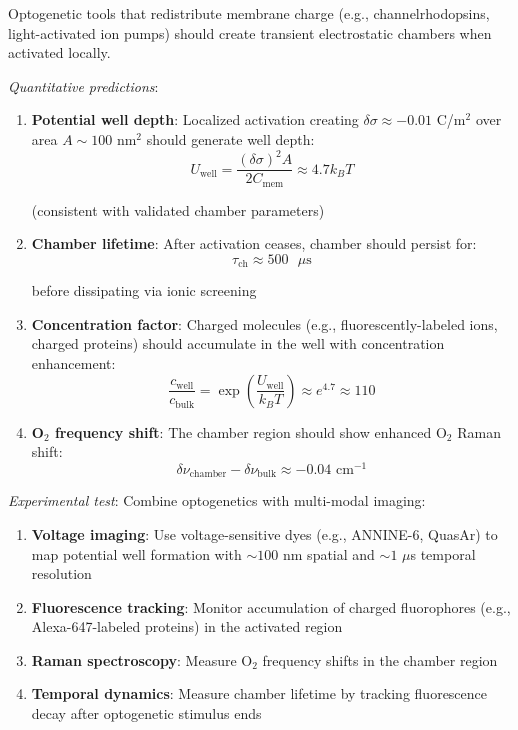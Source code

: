 \documentclass[twocolumn,10pt,aps,prd,superscriptaddress,floatfix,nofootinbib]{revtex4-2}
\theoremstyle{remark}
\begin{document}
Optogenetic tools that redistribute membrane charge (e.g., channelrhodopsins, light-activated ion pumps) should create transient electrostatic chambers when activated locally.

\textit{Quantitative predictions}:
\begin{enumerate}
\item \textbf{Potential well depth}: Localized activation creating $\delta\sigma \approx -0.01$ C/m$^2$ over area $A \sim 100$ nm$^2$ should generate well depth:
\begin{equation}
U_{\mathrm{well}} = \frac{(\delta\sigma)^2 A}{2C_{\mathrm{mem}}} \approx 4.7 k_B T
\end{equation}

(consistent with validated chamber parameters)

\item \textbf{Chamber lifetime}: After activation ceases, chamber should persist for:
\begin{equation}
\tau_{\mathrm{ch}} \approx 500 \text{ $\mu$s}
\end{equation}

before dissipating via ionic screening

\item \textbf{Concentration factor}: Charged molecules (e.g., fluorescently-labeled ions, charged proteins) should accumulate in the well with concentration enhancement:
\begin{equation}
\frac{c_{\mathrm{well}}}{c_{\mathrm{bulk}}} = \exp\left(\frac{U_{\mathrm{well}}}{k_B T}\right) \approx e^{4.7} \approx 110
\end{equation}

\item \textbf{O$_2$ frequency shift}: The chamber region should show enhanced O$_2$ Raman shift:
\begin{equation}
\delta\nu_{\mathrm{chamber}} - \delta\nu_{\mathrm{bulk}} \approx -0.04 \text{ cm}^{-1}
\end{equation}
\end{enumerate}

\textit{Experimental test}: Combine optogenetics with multi-modal imaging:
\begin{enumerate}
\item \textbf{Voltage imaging}: Use voltage-sensitive dyes (e.g., ANNINE-6, QuasAr) to map potential well formation with $\sim 100$ nm spatial and $\sim 1$ $\mu$s temporal resolution
\item \textbf{Fluorescence tracking}: Monitor accumulation of charged fluorophores (e.g., Alexa-647-labeled proteins) in the activated region
\item \textbf{Raman spectroscopy}: Measure O$_2$ frequency shifts in the chamber region
\item \textbf{Temporal dynamics}: Measure chamber lifetime by tracking fluorescence decay after optogenetic stimulus ends
\end{enumerate}
\end{document}
